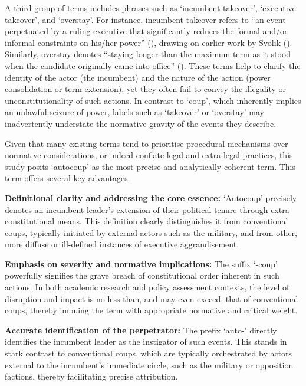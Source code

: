 \documentclass[
  12pt,
]{report}
\begin{document}
A third group of terms includes phrases such as `incumbent takeover',
`executive takeover', and `overstay'. For instance, incumbent takeover
refers to ``an event perpetuated by a ruling executive that
significantly reduces the formal and/or informal constraints on his/her
power'' (),
drawing on earlier work by Svolik ().
Similarly, overstay denotes ``staying longer than the maximum term as it
stood when the candidate originally came into office''
(). These terms help to clarify the identity of the actor (the
incumbent) and the nature of the action (power consolidation or term
extension), yet they often fail to convey the illegality or
unconstitutionality of such actions. In contrast to `coup', which
inherently implies an unlawful seizure of power, labels such as
`takeover' or `overstay' may inadvertently understate the normative
gravity of the events they describe.

Given that many existing terms tend to prioritise procedural mechanisms
over normative considerations, or indeed conflate legal and extra-legal
practices, this study posits `autocoup' as the most precise and
analytically coherent term. This term offers several key advantages.

\textbf{Definitional clarity and addressing the core essence:}
`Autocoup' precisely denotes an incumbent leader's extension of their
political tenure through extra-constitutional means. This definition
clearly distinguishes it from conventional coups, typically initiated by
external actors such as the military, and from other, more diffuse or
ill-defined instances of executive aggrandisement.

\textbf{Emphasis on severity and normative implications:} The suffix
`-coup' powerfully signifies the grave breach of constitutional order
inherent in such actions. In both academic research and policy
assessment contexts, the level of disruption and impact is no less than,
and may even exceed, that of conventional coups, thereby imbuing the
term with appropriate normative and critical weight.

\textbf{Accurate identification of the perpetrator:} The prefix `auto-'
directly identifies the incumbent leader as the instigator of such
events. This stands in stark contrast to conventional coups, which are
typically orchestrated by actors external to the incumbent's immediate
circle, such as the military or opposition factions, thereby
facilitating precise attribution.
\end{document}
